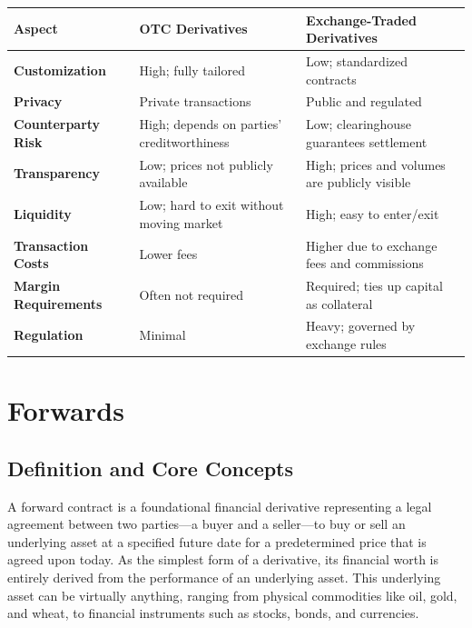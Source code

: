 \documentclass[12pt,openany]{book}
\begin{document}
\begin{center}
\small
\renewcommand{\arraystretch}{1.2}
\begin{tabular}{|L{0.20\textwidth}|L{0.28\textwidth}|L{0.42\textwidth}|}
\hline
\textbf{Aspect} & \textbf{OTC Derivatives} & \textbf{Exchange-Traded Derivatives} \\ \hline
\textbf{Customization} & High; fully tailored & Low; standardized contracts \\ \hline
\textbf{Privacy} & Private transactions & Public and regulated \\ \hline
\textbf{Counterparty Risk} & High; depends on parties' creditworthiness & Low; clearinghouse guarantees settlement \\ \hline
\textbf{Transparency} & Low; prices not publicly available & High; prices and volumes are publicly visible \\ \hline
\textbf{Liquidity} & Low; hard to exit without moving market & High; easy to enter/exit \\ \hline
\textbf{Transaction Costs} & Lower fees & Higher due to exchange fees and commissions \\ \hline
\textbf{Margin Requirements} & Often not required & Required; ties up capital as collateral \\ \hline
\textbf{Regulation} & Minimal & Heavy; governed by exchange rules \\ \hline
\end{tabular}
\end{center}


\section{Forwards}

\subsection{Definition and Core Concepts}

A forward contract is a foundational financial derivative representing a legal agreement between two parties---a buyer and a seller---to buy or sell an underlying asset at a specified future date for a predetermined price that is agreed upon today. As the simplest form of a derivative, its financial worth is entirely derived from the performance of an underlying asset. This underlying asset can be virtually anything, ranging from physical commodities like oil, gold, and wheat, to financial instruments such as stocks, bonds, and currencies.
\end{document}
